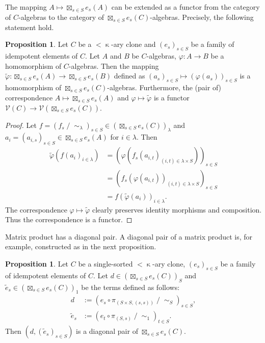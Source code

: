\documentclass[a4paper,10pt]{article}
\theoremstyle{definition}
\newtheorem{prop}[df]{Proposition}
\newcommand\ph{\varphi}
\newcommand\ra{\rightarrow}
\newcommand\mc{\mathclose}
\newcommand\V{\mathcal{V}}
\begin{document}
The mapping $A\mapsto \boxtimes_{s\in S}e_s(A)$ can be extended as a functor
from the category of $C$-algebras to the category of $\boxtimes_{s\in S}e_s(C)$-algebras.
Precisely, the following statement hold.
\begin{prop}
Let $C$ be a $<\mc\kappa$-ary clone and $(e_s)_{s\in S}$ be a
family of idempotent elements of $C$.
Let $A$ and $B$ be $C$-algebras, $\ph:A\ra B$ be a homomorphism of $C$-algebras.
Then the mapping \mbox{$\tilde{\ph}:\boxtimes_{s\in S}e_s(A)\ra \boxtimes_{s\in S}e_s(B)$}
defined as $(a_s)_{s\in S}\mapsto (\ph(a_s))_{s\in S}$ is a homomorphism of
$\boxtimes_{s\in S}e_s(C)$-algebras.
Furthermore, the (pair of) correspondence $A\mapsto \boxtimes_{s\in S}e_s(A)$ and
$\ph\mapsto \tilde{\ph}$ is a functor $\V(C)\ra \V(\boxtimes_{s\in S}e_s(C))$.
\end{prop}
\begin{proof}
Let $f=(f_s\mc/\mc\sim_\lambda)_{s\in S}\in (\boxtimes_{s\in S}e_s(C))_{\lambda}$ and
$a_{i}=(a_{i,s})_{s\in S}\in \boxtimes_{s\in S}e_s(A)$ for $i\in\lambda$.
Then
\begin{align*}
\tilde{\ph}(f(a_i)_{i\in\lambda})
&=(\ph(f_s(a_{i,t})_{(i,t)\in\lambda\times S}))_{s\in S}\\
&=(f_s(\ph(a_{i,t}))_{(i,t)\in\lambda\times S})_{s\in S}\\
&=f(\tilde{\ph}(a_i))_{i\in\lambda}.
\end{align*}
The correspondence $\ph\mapsto \tilde{\ph}$ clearly preserves
identity morphisms and composition.
Thus the correspondence is a functor.
\end{proof}

Matrix product has a diagonal pair.
A diagonal pair of a matrix product is, for example,
constructed as in the next proposition.
\begin{prop}
Let $C$ be a single-sorted $<\mc\kappa$-ary clone, $(e_s)_{s\in S}$ be
a family of idempotent elements of $C$.
Let $d\in (\boxtimes_{s\in S} e_s(C))_{S}$ and 
$\tilde{e}_s\in (\boxtimes_{s\in S} e_s(C))_1$ be the terms defined as follows:
\begin{align*}
d&:=(e_s\circ \pi_{(S\times S,(s,s))}\mc/\mc\sim_S)_{s\in S},\\
\tilde{e}_s&:=(e_t\circ \pi_{(S,s)}\mc/\mc\sim_1)_{t\in S}.
\end{align*}
Then $(d,(\tilde{e}_s)_{s\in S})$ is a diagonal pair of
$\boxtimes_{s\in S}e_s(C)$.
\end{prop}
\end{document}
